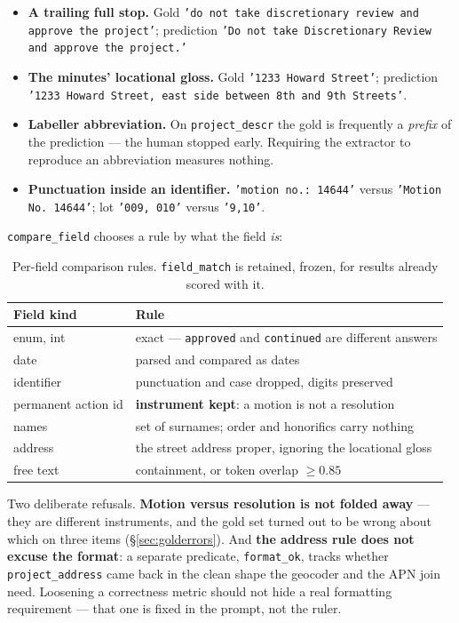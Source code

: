 \documentclass[11pt]{article}
\begin{document}
\begin{itemize}
\item \textbf{A trailing full stop.} Gold \texttt{'do not take discretionary review and
approve the project'}; prediction \texttt{'Do not take Discretionary Review and approve the
project.'}
\item \textbf{The minutes' locational gloss.} Gold \texttt{'1233 Howard Street'}; prediction
\texttt{'1233 Howard Street, east side between 8th and 9th Streets'}.
\item \textbf{Labeller abbreviation.} On \texttt{project\_descr} the gold is frequently a
\emph{prefix} of the prediction --- the human stopped early. Requiring the extractor to
reproduce an abbreviation measures nothing.
\item \textbf{Punctuation inside an identifier.} \texttt{'motion no.: 14644'} versus
\texttt{'Motion No. 14644'}; lot \texttt{'009, 010'} versus \texttt{'9,10'}.
\end{itemize}

\texttt{compare\_field} chooses a rule by what the field \emph{is}:

\begin{table}[h]
\centering
\begin{tabular}{ll}
\toprule
Field kind & Rule \\
\midrule
enum, int           & exact --- \texttt{approved} and \texttt{continued} are different answers \\
date                & parsed and compared as dates \\
identifier          & punctuation and case dropped, digits preserved \\
permanent action id & \textbf{instrument kept}: a motion is not a resolution \\
names               & set of surnames; order and honorifics carry nothing \\
address             & the street address proper, ignoring the locational gloss \\
free text           & containment, or token overlap $\geq 0.85$ \\
\bottomrule
\end{tabular}
\caption{Per-field comparison rules. \texttt{field\_match} is retained, frozen, for results
already scored with it.}
\end{table}

Two deliberate refusals. \textbf{Motion versus resolution is not folded away} --- they are
different instruments, and the gold set turned out to be wrong about which on three items
(\S\ref{sec:golderrors}). And \textbf{the address rule does not excuse the format}: a separate
predicate, \texttt{format\_ok}, tracks whether \texttt{project\_address} came back in the
clean shape the geocoder and the APN join need. Loosening a correctness metric should not
hide a real formatting requirement --- that one is fixed in the prompt, not the ruler.
\end{document}
